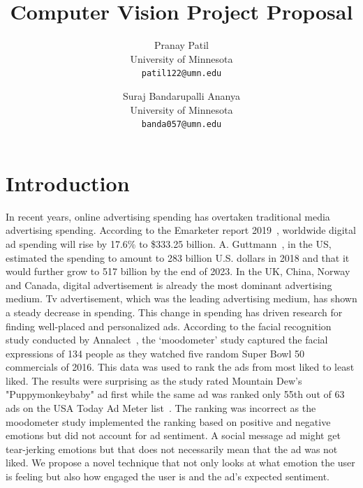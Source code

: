 \documentclass[10pt,twocolumn,letterpaper]{article}
\begin{document}
\title{Computer Vision Project Proposal}

\author{Pranay Patil\\
University of Minnesota\\
{\tt\small patil122@umn.edu}
\and
Suraj Bandarupalli Ananya\\
University of Minnesota\\
{\tt\small banda057@umn.edu}
}

\maketitle


\section{Introduction}
In recent years, online advertising spending has overtaken traditional media advertising spending. According to the Emarketer report 2019~\cite{GDAS}, worldwide digital ad spending will rise by 17.6\% to \$333.25 billion. A. Guttmann~\cite{GDSW}, in the US, estimated the spending to amount to 283 billion U.S. dollars in 2018 and that it would further grow to 517 billion by the end of 2023. In the UK, China, Norway and Canada, digital advertisement is already the most dominant advertising medium. Tv advertisement, which was the leading advertising medium, has shown a steady decrease in spending. This change in spending has driven research for finding well-placed and personalized ads. According to the facial recognition study conducted by Annalect~\cite{moodmeter}, the ‘moodometer’ study captured the facial expressions of 134 people as they watched five random Super Bowl 50 commercials of 2016. This data was used to rank the ads from most liked to least liked. The results were surprising as the study rated Mountain Dew’s "Puppymonkeybaby" ad first while the same ad was ranked only 55th out of 63 ads on the USA Today Ad Meter list~\cite{admeter}. The ranking was incorrect as the moodometer study implemented the ranking based on positive and negative emotions but did not account for ad sentiment. A social message ad might get tear-jerking emotions but that does not necessarily mean that the ad was not liked. We propose a novel technique that not only looks at what emotion the user is feeling but also how engaged the user is and the ad’s expected sentiment.
\end{document}
